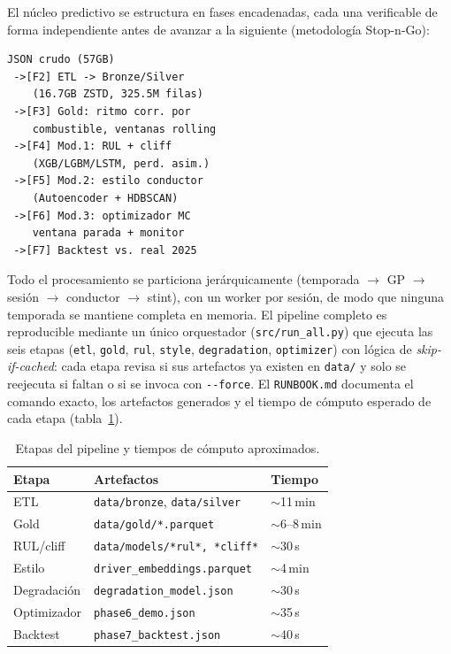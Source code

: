 \documentclass[conference]{IEEEtran}
\begin{document}
El núcleo predictivo se estructura en fases encadenadas, cada una
verificable de forma independiente antes de avanzar a la siguiente
(metodología Stop-n-Go):

{\scriptsize
\begin{verbatim}
JSON crudo (57GB)
 ->[F2] ETL -> Bronze/Silver
    (16.7GB ZSTD, 325.5M filas)
 ->[F3] Gold: ritmo corr. por
    combustible, ventanas rolling
 ->[F4] Mod.1: RUL + cliff
    (XGB/LGBM/LSTM, perd. asim.)
 ->[F5] Mod.2: estilo conductor
    (Autoencoder + HDBSCAN)
 ->[F6] Mod.3: optimizador MC
    ventana parada + monitor
 ->[F7] Backtest vs. real 2025
\end{verbatim}}

Todo el procesamiento se particiona jerárquicamente
(temporada $\rightarrow$ GP $\rightarrow$ sesión $\rightarrow$
conductor $\rightarrow$ stint), con un worker por sesión, de modo que
ninguna temporada se mantiene completa en memoria. El pipeline completo
es reproducible mediante un único orquestador
(\texttt{src/run\_all.py}) que ejecuta las seis etapas
(\texttt{etl}, \texttt{gold}, \texttt{rul}, \texttt{style},
\texttt{degradation}, \texttt{optimizer}) con lógica de
\emph{skip-if-cached}: cada etapa revisa si sus artefactos ya existen
en \texttt{data/} y solo se reejecuta si faltan o si se invoca con
\texttt{-{}-force}. El \texttt{RUNBOOK.md} documenta el comando exacto,
los artefactos generados y el tiempo de cómputo esperado de cada etapa
(tabla~\ref{tab:runbook}).

\begin{table}[!htbp]
\centering
\caption{Etapas del pipeline y tiempos de cómputo aproximados.}
\label{tab:runbook}
\begin{tabular}{@{}lll@{}}
\toprule
\textbf{Etapa} & \textbf{Artefactos} & \textbf{Tiempo} \\
\midrule
ETL & \texttt{data/bronze}, \texttt{data/silver} & $\sim$11\,min \\
Gold & \texttt{data/gold/*.parquet} & $\sim$6--8\,min \\
RUL/cliff & \texttt{data/models/*rul*, *cliff*} & $\sim$30\,s \\
Estilo & \texttt{driver\_embeddings.parquet} & $\sim$4\,min \\
Degradación & \texttt{degradation\_model.json} & $\sim$30\,s \\
Optimizador & \texttt{phase6\_demo.json} & $\sim$35\,s \\
Backtest & \texttt{phase7\_backtest.json} & $\sim$40\,s \\
\bottomrule
\end{tabular}
\end{table}
\end{document}
